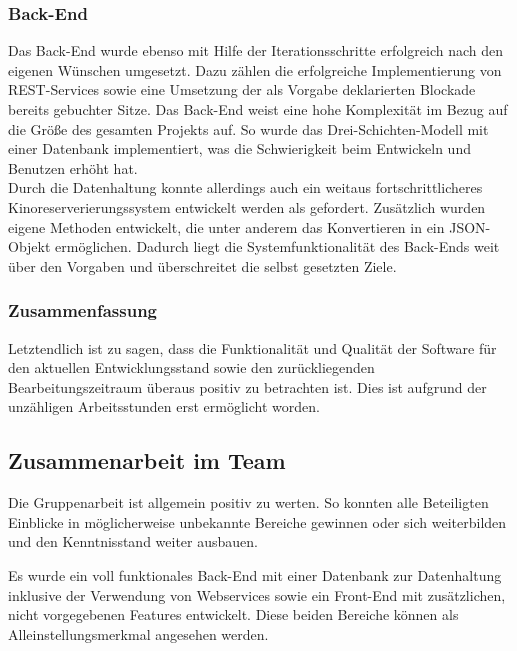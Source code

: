 \subsubsection*{Back-End}
Das Back-End wurde ebenso mit Hilfe der Iterationsschritte erfolgreich nach den eigenen Wünschen umgesetzt.
Dazu zählen die erfolgreiche Implementierung von \acs{REST}-Services sowie eine Umsetzung der als Vorgabe deklarierten Blockade bereits gebuchter Sitze.
Das Back-End weist eine hohe Komplexität im Bezug auf die Größe des gesamten Projekts auf.
So wurde das Drei-Schichten-Modell mit einer Datenbank implementiert, was die Schwierigkeit beim Entwickeln und Benutzen erhöht hat.\\
Durch die Datenhaltung konnte allerdings auch ein weitaus fortschrittlicheres Kinoreserverierungssystem entwickelt werden als gefordert.
Zusätzlich wurden eigene Methoden entwickelt, die unter anderem das Konvertieren in ein \acs{JSON}-Objekt ermöglichen. Dadurch liegt die Systemfunktionalität des Back-Ends weit über den Vorgaben und überschreitet die selbst gesetzten Ziele.

\subsubsection*{Zusammenfassung}
Letztendlich ist zu sagen, dass die Funktionalität und Qualität der Software für den aktuellen Entwicklungsstand sowie den zurückliegenden Bearbeitungszeitraum überaus positiv zu betrachten ist.
Dies ist aufgrund der unzähligen Arbeitsstunden erst ermöglicht worden.

\subsection{Zusammenarbeit im Team}

Die Gruppenarbeit ist allgemein positiv zu werten. 
So konnten alle Beteiligten Einblicke in möglicherweise unbekannte Bereiche gewinnen oder sich weiterbilden und den Kenntnisstand weiter ausbauen.

Es wurde ein voll funktionales Back-End mit einer Datenbank zur Datenhaltung inklusive der Verwendung von Webservices sowie ein Front-End mit zusätzlichen, nicht vorgegebenen Features entwickelt. Diese beiden Bereiche können als Alleinstellungsmerkmal angesehen werden.

